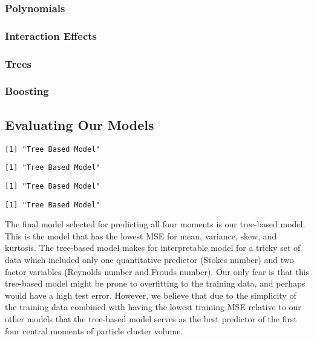 \documentclass[
  letterpaper,
  DIV=11,
  numbers=noendperiod]{scrartcl}
\begin{document}
\hypertarget{polynomials}{%
\subsubsection{Polynomials}\label{polynomials}}

\hypertarget{interaction-effects}{%
\subsubsection{Interaction Effects}\label{interaction-effects}}

\hypertarget{trees}{%
\subsubsection{Trees}\label{trees}}

\hypertarget{boosting}{%
\subsubsection{Boosting}\label{boosting}}

\hypertarget{evaluating-our-models}{%
\subsection{Evaluating Our Models}\label{evaluating-our-models}}

\begin{verbatim}
[1] "Tree Based Model"
\end{verbatim}

\begin{verbatim}
[1] "Tree Based Model"
\end{verbatim}

\begin{verbatim}
[1] "Tree Based Model"
\end{verbatim}

\begin{verbatim}
[1] "Tree Based Model"
\end{verbatim}

The final model selected for predicting all four moments is our
tree-based model. This is the model that has the lowest MSE for mean,
variance, skew, and kurtosis. The tree-based model makes for
interpretable model for a tricky set of data which included only one
quantitative predictor (Stokes number) and two factor variables
(Reynolds number and Frouds number). Our only fear is that this
tree-based model might be prone to overfitting to the training data, and
perhaps would have a high test error. However, we believe that due to
the simplicity of the training data combined with having the lowest
training MSE relative to our other models that the tree-based model
serves as the best predictor of the first four central moments of
particle cluster volume.
\end{document}
